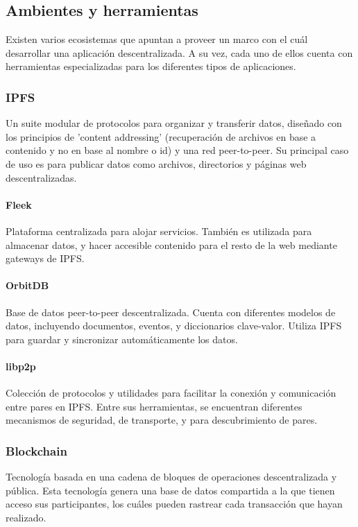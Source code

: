 \subsection{Ambientes y herramientas}
Existen varios ecosistemas que apuntan a proveer un marco con el cuál desarrollar una aplicación descentralizada. A su vez, cada uno de ellos cuenta con herramientas especializadas para los diferentes tipos de aplicaciones.

\subsubsection{IPFS}
Un suite modular de protocolos para organizar y transferir datos, diseñado con los principios de 'content addressing' (recuperación de archivos en base a contenido y no en base al nombre o id) y una red peer-to-peer. Su principal caso de uso es para publicar datos como archivos, directorios y páginas web descentralizadas.\cite{ipfs}

\paragraph{Fleek} Plataforma centralizada para alojar servicios. También es utilizada para almacenar datos, y hacer accesible contenido para el resto de la web mediante gateways de IPFS.\cite{fleek}

\paragraph{OrbitDB} Base de datos peer-to-peer descentralizada. Cuenta con diferentes modelos de datos, incluyendo documentos, eventos, y diccionarios clave-valor. Utiliza IPFS para guardar y sincronizar automáticamente los datos. \cite{orbitdb}

\paragraph{libp2p} Colección de protocolos y utilidades para facilitar la conexión y comunicación entre pares en IPFS. Entre sus herramientas, se encuentran diferentes mecanismos de seguridad, de transporte, y para descubrimiento de pares. \cite{libp2p}

\subsubsection{Blockchain}
Tecnología basada en una cadena de bloques de operaciones descentralizada y pública.  Esta tecnología genera una base de datos compartida a la que tienen acceso sus participantes, los cuáles pueden rastrear cada transacción que hayan realizado.\parencite{blockchain}


